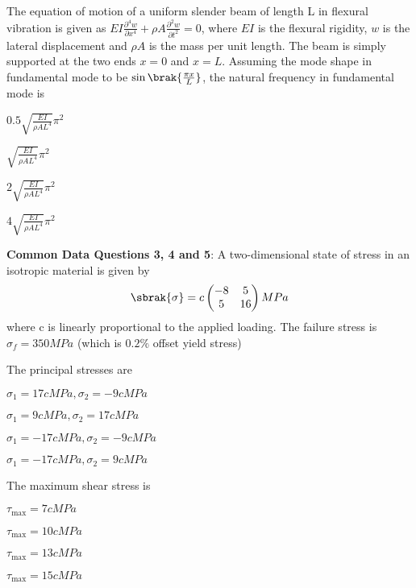 \item The equation of motion of a uniform slender beam of length L in flexural vibration is given as $EI
\frac{{\partial}^4 w}{\partial {x}^{4}} + \rho A \frac{{\partial}^{2} w}{\partial {t}^{2}}=0$, where $EI$ is the flexural rigidity, $w$ is the lateral displacement and $\rho A$ is the mass per unit length. The beam is simply supported at the two ends $x =0$ and $x=L$. Assuming the mode shape in fundamental mode to be $\sin\brak{\frac{{\pi x}}{L}}$, the natural frequency in fundamental mode is 
\begin{enumerate}
\begin{multicols}{4}
\item $ 0.5 \sqrt{\frac{EI}{\rho A {L}^{4}}} {\pi}^{2}$
\item $ \sqrt{\frac{EI}{\rho A {L}^{4}}} {\pi}^{2}$
\item $2\sqrt{\frac{EI}{\rho A {L}^{4}}} {\pi}^{2}$
\item $4\sqrt{\frac{EI}{\rho A {L}^{4}}} {\pi}^{2}$
\end{multicols}
\end{enumerate}

\item[] \textbf{Common Data Questions 3, 4 and 5}: A two-dimensional state of stress in an isotropic material is given by 
\begin{align}
   \sbrak{\sigma} = c \begin{pmatrix}-8 & 5 \\ 5 & 16\end{pmatrix} MPa
\end{align} 
where c is linearly proportional to the applied loading. The failure stress is $\sigma_{f}=350MPa$ (which is $0.2\%$ offset yield stress)
\item The principal stresses are 
\begin{enumerate}
\begin{multicols}{2}
\item $\sigma_{1} = 17c MPa, \sigma_{2} = -9c MPa$
\item $\sigma_{1} = 9c MPa, \sigma_{2} = 17c MPa$
\item $\sigma_{1} = -17c MPa, \sigma_{2} = -9c MPa$
\item $\sigma_{1} = -17c MPa, \sigma_{2} = 9c MPa$
\end{multicols}
\end{enumerate}

\item  The maximum shear stress is 
\begin{enumerate}
\begin{multicols}{4}
    \item $\tau_{\text{max}}=7c MPa$
    \item $\tau_{\text{max}}=10c MPa$
    \item $\tau_{\text{max}}=13c MPa$
    \item $\tau_{\text{max}}=15c MPa$
\end{multicols}
\end{enumerate}


